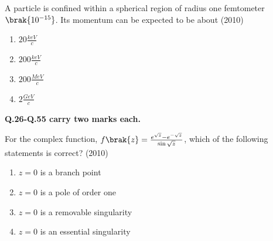     \item A particle is confined within a spherical region of radius one femtometer $\brak{10^{-15}}$. Its momentum can be expected to be about \hfill (2010)
    \begin{enumerate}[label=(\Alph*)]
        \item $20\frac{keV}{c}$
        \item $200\frac{keV}{c}$
        \item $200\frac{MeV}{c}$
        \item $2\frac{GeV}{c}$
    \end{enumerate}
    \textbf{Q.26-Q.55 carry two marks each.}
    \item For the complex function, $f\brak{z}=\frac{e^{\sqrt{z}}-e^{-\sqrt{z}}}{\sin \sqrt{z}}$, which of the following statements is correct? \hfill (2010)
    \begin{enumerate}[label=(\Alph*)]
        \item $z=0$ is a branch point
        \item $z=0$ is a pole of order one
        \item $z=0$ is a removable singularity
        \item $z=0$ is an essential singularity
    \end{enumerate} 

